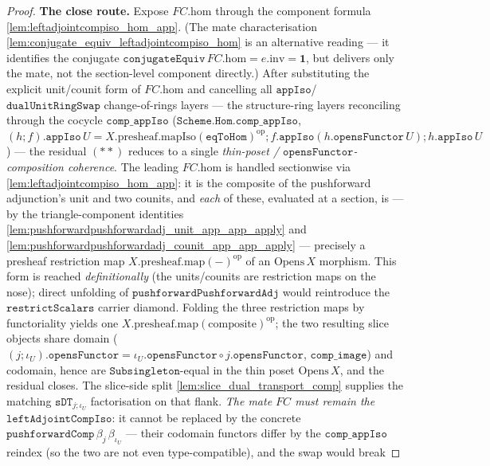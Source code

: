 \begin{proof}
  \textbf{The close route.} Expose \(FC.\mathrm{hom}\) through the component formula
  \cref{lem:leftadjointcompiso_hom_app}. (The mate characterisation
  \cref{lem:conjugate_equiv_leftadjointcompiso_hom} is an alternative reading --- it identifies the
  conjugate \(\mathtt{conjugateEquiv}\,FC.\mathrm{hom} = e.\mathrm{inv} = \mathbf 1\), but delivers only
  the mate, not the section-level component directly.) After
  substituting the explicit unit/counit form of \(FC.\mathrm{hom}\) and cancelling all
  \(\mathtt{appIso}\)/\(\mathtt{dualUnitRingSwap}\) change-of-rings layers --- the structure-ring layers
  reconciling through the cocycle \(\mathtt{comp\_appIso}\) (\(\mathtt{Scheme.Hom.comp\_appIso}\),
  \((h \mathbin{;} f).\mathtt{appIso}\,U = X.\mathrm{presheaf}.\mathrm{mapIso}(\mathtt{eqToHom})^{\mathrm{op}}
  \mathbin{;} f.\mathtt{appIso}(h.\mathtt{opensFunctor}\,U) \mathbin{;} h.\mathtt{appIso}\,U\)) ---
  the residual \((**)\) reduces to a single \emph{thin-poset / \(\mathtt{opensFunctor}\)-composition
  coherence}. The leading \(FC.\mathrm{hom}\) is handled sectionwise via \cref{lem:leftadjointcompiso_hom_app}: it is the composite of the pushforward adjunction's
  unit and two counits, and \emph{each} of these, evaluated at a section, is --- by the triangle-component
  identities \cref{lem:pushforwardpushforwardadj_unit_app_app_apply} and
  \cref{lem:pushforwardpushforwardadj_counit_app_app_apply} --- precisely a presheaf restriction map
  \(X.\mathrm{presheaf}.\mathrm{map}(-)^{\mathrm{op}}\) of an \(\mathrm{Opens}\,X\) morphism. This form is
  reached \emph{definitionally} (the units/counits are restriction maps on the nose); direct unfolding
  of \(\mathtt{pushforwardPushforwardAdj}\) would reintroduce the
  \(\mathtt{restrictScalars}\) carrier diamond. Folding the three restriction maps by functoriality
  yields one \(X.\mathrm{presheaf}.\mathrm{map}(\text{composite})^{\mathrm{op}}\); the two resulting
  slice objects share domain (\((j\mathbin{;}\iota_U).\mathtt{opensFunctor} =
  \iota_U.\mathtt{opensFunctor}\circ j.\mathtt{opensFunctor}\), \(\mathtt{comp\_image}\)) and codomain,
  hence are \(\mathtt{Subsingleton}\)-equal in the thin poset \(\mathrm{Opens}\,X\), and the residual
  closes. The slice-side split \cref{lem:slice_dual_transport_comp} supplies the matching
  \(\mathtt{sDT}_{j\mathbin{;}\iota_U}\) factorisation on that flank. \emph{The mate \(FC\) must remain
  the \(\mathtt{leftAdjointCompIso}\)}: it cannot be replaced by the concrete
  \(\mathtt{pushforwardComp}\,\beta_j\,\beta_{\iota_U}\) --- their codomain functors differ by the
  \(\mathtt{comp\_appIso}\) reindex (so the two are not even type-compatible), and the swap would break

\end{proof}
